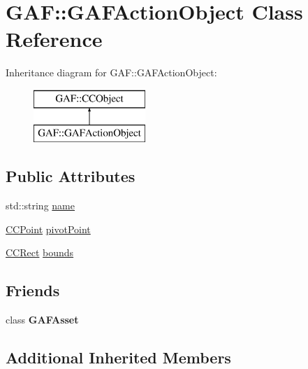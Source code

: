 \hypertarget{class_g_a_f_1_1_g_a_f_action_object}{\section{G\-A\-F\-:\-:G\-A\-F\-Action\-Object Class Reference}
\label{class_g_a_f_1_1_g_a_f_action_object}
}
Inheritance diagram for G\-A\-F\-:\-:G\-A\-F\-Action\-Object\-:\begin{figure}[H]
\begin{center}
\leavevmode
\includegraphics[height=2.000000cm]{class_g_a_f_1_1_g_a_f_action_object}
\end{center}
\end{figure}
\subsection*{Public Attributes}
\begin{DoxyCompactItemize}
\item 
std\-::string \hyperlink{class_g_a_f_1_1_g_a_f_action_object_a696f101b3aebdf344632e81a95224643}{name}
\item 
\hyperlink{class_g_a_f_1_1_c_c_point}{C\-C\-Point} \hyperlink{class_g_a_f_1_1_g_a_f_action_object_a01c42a4efc8e307d1e4ac799fffaedff}{pivot\-Point}
\item 
\hyperlink{class_g_a_f_1_1_c_c_rect}{C\-C\-Rect} \hyperlink{class_g_a_f_1_1_g_a_f_action_object_a9c0d295e1fb13ee4f6393bb08084565c}{bounds}
\end{DoxyCompactItemize}
\subsection*{Friends}
\begin{DoxyCompactItemize}
\item 
\hypertarget{class_g_a_f_1_1_g_a_f_action_object_adda4123c09612e8468a449e138c2f396}{class {\bfseries G\-A\-F\-Asset}}\label{class_g_a_f_1_1_g_a_f_action_object_adda4123c09612e8468a449e138c2f396}

\end{DoxyCompactItemize}
\subsection*{Additional Inherited Members}


